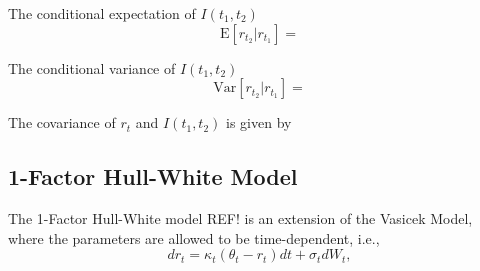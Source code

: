 \documentclass{report}
\newcommand{\E}{\mathrm{E}}
\newcommand{\Var}{\mathrm{Var}}
\begin{document}
The conditional expectation of $I(t_{1}, t_{2})$
\begin{equation}
\E \left[ r_{t_2} | r_{t_1} \right] = 
\end{equation}

The conditional variance of $I(t_{1}, t_{2})$
\begin{equation}
\Var \left[ r_{t_2} | r_{t_1} \right] = 
\end{equation}

The covariance of $r_t$ and $I(t_{1}, t_{2})$ is given by


\subsection{1-Factor Hull-White Model}
The 1-Factor Hull-White model REF! is an extension of the Vasicek Model, where the parameters are allowed to be time-dependent, i.e.,
\begin{equation}
dr_t = \kappa_t \left( \theta_t - r_t \right) dt + \sigma_t dW_t,
\end{equation}
\end{document}
